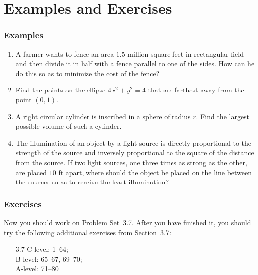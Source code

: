 \documentclass[serif,ignorenonframetext]{beamer}
\begin{document}
\section{Examples and Exercises}

\begin{frame}
  \frametitle{Examples}
  \begin{enumerate}
  \item A farmer wants to fence an area $1.5$ million square feet in 
    rectangular field and then divide it in half with a fence parallel
    to one of the sides.  How can he do this so as to minimize the cost of
    the fence?
  \item Find the points on the ellipse $4x^2+y^2=4$ that are farthest
    away from the point $(0,1)$.
  \item A right circular cylinder is inscribed in a sphere of radius $r$.
    Find the largest possible volume of such a cylinder.
  \item The illumination of an object by a light source is directly
    proportional to the strength of the source and inversely proportional
    to the square of the distance from the source.  If two light sources,
    one three times as strong as the other, are placed $10$ ft apart,
    where should the object be placed on the line between the sources so
    as to receive the least illumination?
  \end{enumerate}
\end{frame}

\begin{frame}
  \frametitle{Exercises}
  Now you should work on Problem Set~3.7.  After you have finished it,
  you should try the following additional exercises from Section~3.7:
  \begin{itemize}
  \item[3.7]
    C-level: 1--64; \\
    B-level: 65--67, 69--70; \\
    A-level: 71--80
  \end{itemize}
\end{frame}
\end{document}
